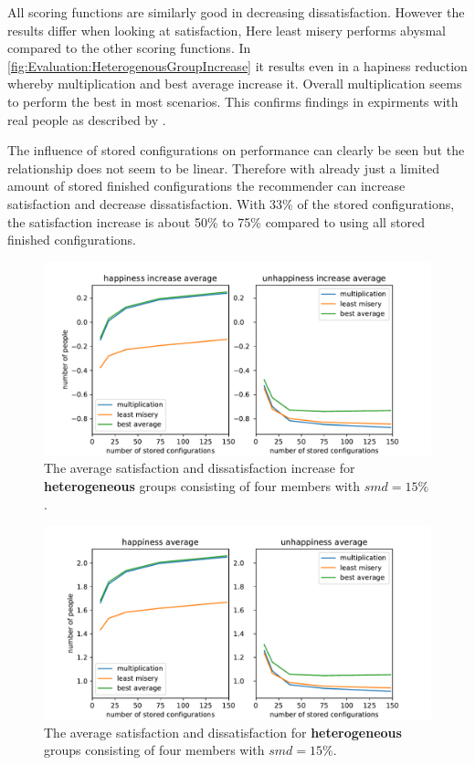 All scoring functions are similarly good in decreasing dissatisfaction. However the results differ when looking at satisfaction, Here least misery performs abysmal compared to the other scoring functions. In \autoref{fig:Evaluation:HeterogenousGroupIncrease} it results even in a hapiness reduction whereby multiplication and best average increase it. Overall multiplication seems to perform the best in most scenarios. This confirms findings in expirments with real people as described by \citeauthor{Masthoff2015} \cite[p. 755f]{Masthoff2015}.

The influence of stored configurations on performance can clearly be seen but the relationship does not seem to be linear. Therefore with already just a limited amount of stored finished configurations the recommender can increase satisfaction and decrease dissatisfaction. With 33\% of the stored configurations, the satisfaction increase is about 50\% to 75\% compared to using all stored finished configurations.



\begin{figure}
    \centering
    \includegraphics[width=1\textwidth]{./figures/60_evaluation/heterogeneous_happy_unhappy_increase_amount-1000_smd-15.pdf}
    \caption{The average satisfaction and dissatisfaction increase for \textbf{heterogeneous} groups consisting of four members with $smd=15\%$.}
    \label{fig:Evaluation:HeterogenousGroupIncrease}
\end{figure}

\begin{figure}
    \centering
    \includegraphics[width=1\textwidth]{./figures/60_evaluation/heterogeneous_happy_unhappy_total_group_amount-1000_smd-15.pdf}
    \caption{The average satisfaction and dissatisfaction for \textbf{heterogeneous} groups consisting of four members with $smd=15\%$.}
    \label{fig:Evaluation:HeterogenousGroupTotal}
\end{figure}

